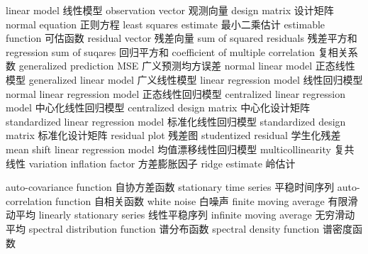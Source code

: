 {linear model} 
{线性模型}
{observation vector} 
{观测向量}
{design matrix} 
{设计矩阵}
{normal equation} 
{正则方程}
{least squares estimate} 
{最小二乘估计}
{estimable function} 
{可估函数}
{residual vector} 
{残差向量}
{sum of squared residuals} 
{残差平方和}
{regression sum of suqares} 
{回归平方和}
{coefficient of multiple correlation} 
{复相关系数}
{generalized prediction MSE} 
{广义预测均方误差}
{normal linear model} 
{正态线性模型}
{generalized linear model} 
{广义线性模型}
{linear regression model} 
{线性回归模型}
{normal linear regression model} 
{正态线性回归模型}
{centralized linear regression model} 
{中心化线性回归模型}
{centralized design matrix} 
{中心化设计矩阵}
{standardized linear regression model} 
{标准化线性回归模型}
{standardized design matrix} 
{标准化设计矩阵}
{residual plot} 
{残差图}
{studentized residual} 
{学生化残差}
{mean shift linear regression model} 
{均值漂移线性回归模型}
{multicollinearity} 
{复共线性}
{variation inflation factor} 
{方差膨胀因子}
{ridge estimate} 
{岭估计}

{auto-covariance function} 
{自协方差函数}
{stationary time series} 
{平稳时间序列}
{auto-correlation function} 
{自相关函数}
{white noise} 
{白噪声}
{finite moving average} 
{有限滑动平均}
{linearly stationary series} 
{线性平稳序列}
{infinite moving average} 
{无穷滑动平均}
{spectral distribution function} 
{谱分布函数}
{spectral density function} 
{谱密度函数}


